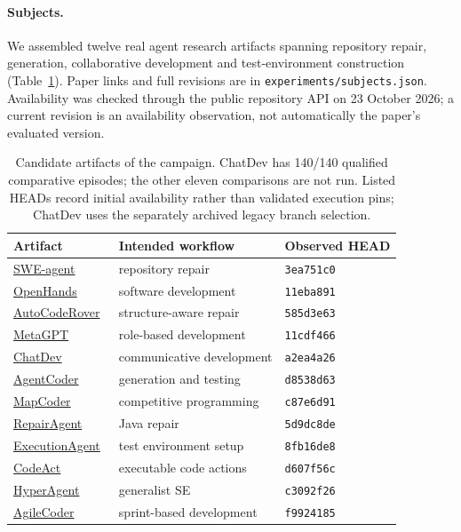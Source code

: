 \documentclass[pdflatex,sn-mathphys-num]{sn-jnl}
\theoremstyle{thmstylethree}
\newcommand{\code}[1]{\texttt{#1}}
\begin{document}
\paragraph{Subjects.} We assembled twelve real agent research artifacts spanning repository repair, generation, collaborative development and test-environment construction (Table~\ref{tab:subjects}). Paper links and full revisions are in \code{experiments/subjects.json}. Availability was checked through the public repository API on 23 October 2026; a current revision is an availability observation, not automatically the paper's evaluated version.
\begin{table}[t]
\caption{Candidate artifacts of the campaign. ChatDev has 140/140 qualified comparative episodes; the other eleven comparisons are not run. Listed HEADs record initial availability rather than validated execution pins; ChatDev uses the separately archived legacy branch selection.}\label{tab:subjects}
\small
\begin{tabularx}{\textwidth}{lXl}
\toprule Artifact & Intended workflow & Observed HEAD \\
\midrule
\href{https://github.com/SWE-agent/SWE-agent}{SWE-agent}~\cite{yang2024sweagent} & repository repair & \texttt{3ea751c0} \\
\href{https://github.com/OpenHands/OpenHands}{OpenHands}~\cite{wang2025openhands} & software development & \texttt{11eba891} \\
\href{https://github.com/AutoCodeRoverSG/auto-code-rover}{AutoCodeRover}~\cite{resaiartifact3} & structure-aware repair & \texttt{585d3e63} \\
\href{https://github.com/FoundationAgents/MetaGPT}{MetaGPT}~\cite{resaiartifact4} & role-based development & \texttt{11cdf466} \\
\href{https://github.com/OpenBMB/ChatDev}{ChatDev}~\cite{resaiartifact5} & communicative development & \texttt{a2ea4a26} \\
\href{https://github.com/huangd1999/AgentCoder}{AgentCoder}~\cite{resaiartifact6} & generation and testing & \texttt{d8538d63} \\
\href{https://github.com/Md-Ashraful-Pramanik/MapCoder}{MapCoder}~\cite{resaiartifact7} & competitive programming & \texttt{c87e6d91} \\
\href{https://github.com/sola-st/RepairAgent}{RepairAgent}~\cite{resaiartifact8} & Java repair & \texttt{5d9dc8de} \\
\href{https://github.com/sola-st/ExecutionAgent}{ExecutionAgent}~\cite{bouzenia2025executionagent} & test environment setup & \texttt{8fb16de8} \\
\href{https://github.com/xingyaoww/code-act}{CodeAct}~\cite{resaiartifact10} & executable code actions & \texttt{d607f56c} \\
\href{https://github.com/FSoft-AI4Code/HyperAgent}{HyperAgent}~\cite{resaiartifact11} & generalist SE & \texttt{c3092f26} \\
\href{https://github.com/FSoft-AI4Code/AgileCoder}{AgileCoder}~\cite{resaiartifact12} & sprint-based development & \texttt{f9924185} \\
\bottomrule
\end{tabularx}


\end{table}
\end{document}
